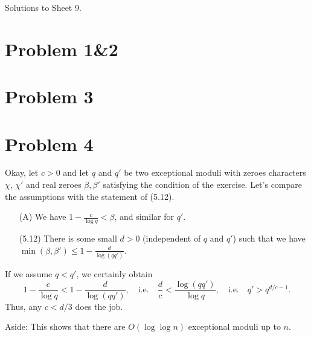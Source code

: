 \documentclass[a4paper,11pt]{article}
\author{Max von Consbruch}
\begin{document}
\begin{center}
    \huge{Solutions to Sheet 9.}
\end{center}

\section*{Problem 1\&2}
\section*{Problem 3}
\section*{Problem 4}
Okay, let $c>0$ and let $q$ and $q'$ be two exceptional moduli with zeroes characters
$\chi$, $\chi'$ and real zeroes $\beta, \beta'$ satisfying the condition of the
exercise. Let's compare the assumptions with the statement of (5.12).
\begin{enumerate}
    \item[(A)] We have $1 - \frac c{\log q} < \beta$, and similar for $q'$.
    \item[(5.12)] There is some small $d>0$ (independent of $q$ and $q'$) such
        that we have $\min(\beta, \beta') \leq 1 - \frac d{\log(qq')}$. 
\end{enumerate}
If we assume $q < q'$, we certainly obtain
\[
    1 - \frac c {\log q} < 1 - \frac d {\log(qq')}, \quad \text{i.e.}
    \quad \frac dc < \frac  {\log(qq')}{\log q}, \quad \text{i.e.} \quad
    q' > q^{d/c - 1}.
\]
Thus, any $c < d/3$ does the job. 

Aside: This shows that there are $O(\log \log n)$ exceptional moduli up to $n$. 


\contactend
\end{document}
